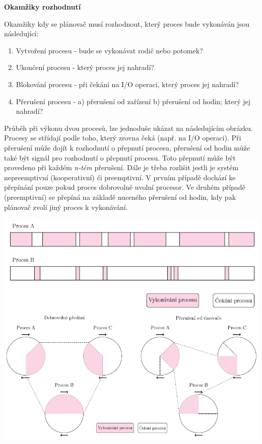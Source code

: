 \begin{Large}
    \vspace{0,5cm}
    \textbf{Okamžiky rozhodnutí}
\end{Large}

Okamžiky kdy se plánovač musí rozhodnout, který proces bude vykonáván jsou následující:
\begin{enumerate}
    \item Vytvoření procesu - bude se vykonávat rodič nebo potomek?
    \item Ukončení procesu - který proces jej nahradí?
    \item Blokování procesu - při čekání na I/O operaci, který proces jej nahradí?
    \item Přerušení procesu - a) přerušení od zařízení b) přerušení od hodin; který jej nahradí?
\end{enumerate}

Průběh při výkonu dvou procesů, lze jednoduše ukázat na následujícím obrázku. Procesy se střídají podle toho, který zrovna čeká (např. na I/O operaci). Při přerušení může dojít k rozhodnutí o přepnutí procesu, přerušení od hodin může také být signál pro rozhodnutí o přepnutí procesu. Toto přepnutí může být provedeno při každém \textit{n-tém} přerušení. 
\vspace{0,5cm}
Dále je třeba rozlišit jestli je systém nepreemptivní (kooperativní) či preemptivní. V prvním případě dochází ke přepínání pouze pokud proces dobrovolně uvolní procesor. Ve druhém případě (preemptivní) se přepíná na základě nuceného přerušení od hodin, kdy pak plánovač zvolí jiný proces k vykonávání. 

\begin{center}
    \includegraphics[scale=1]{images/proc_changing.png}
    \includegraphics[scale=1]{images/proc_preemption.png}
\end{center}

